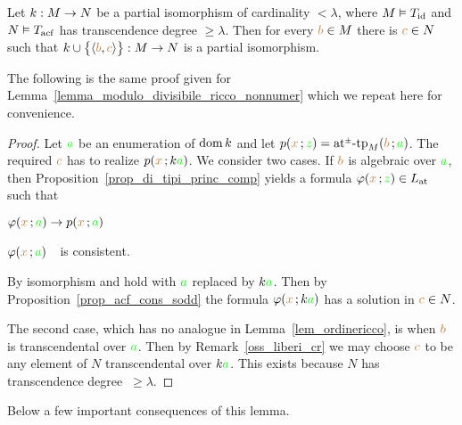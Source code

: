 \begin{lemma}\label{lem_acf_ricco_nonnumer}
Let $k:M\imp N$ be a partial isomorphism of cardinality $<\lambda$, where $M\models T_{\rm id}$ and $N\models T_{\rm acf}$ has transcendence degree $\ge\lambda$.
%
Then for every ${\mr b}\in M$ there is ${\mr c}\in N$ such that $k\cup\big\{\<{\mr b},{\mr c}\>\big\}:M\imp N$ is a partial isomorphism.
\end{lemma}

The following is the same proof given for Lemma~\ref{lemma_modulo_divisibile_ricco_nonnumer} which we repeat here for convenience.

\vspace*{-\parskip}
\begin{proof}
Let ${\gr a}$ be an enumeration of $\dom k$ and let $p({\mr x}\,;{\gr z})=\atpmtp_M({\mr b}\,;{\gr a})$.
%
The required ${\mr c}$ has to realize $p({\mr x}\,;k{\gr a})$.
%
We consider two cases.
%
If ${\mr b}$ is algebraic over ${\gr a}$, then Proposition~\ref{prop_di_tipi_princ_comp} yields a formula $\phi({\mr x}\,;{\gr z})\in L_{\rm at}$ such that 

\noindent{}\hspace{5ex} $\phi({\mr x}\,;{\gr a})\imp p({\mr x}\,;{\gr a})$

\noindent{}\hspace{5ex} $\phi({\mr x}\,;{\gr a})$\ \ is consistent.

By isomorphism  and  hold with ${\gr a}$ replaced by $k{\gr a}$.
%
Then by Proposition~\ref{prop_acf_cons_sodd} the formula $\phi({\mr x}\,;k{\gr a})$ has a solution in ${\mr c}\in N$.

The second case, which has no analogue in Lemma~\ref{lem_ordinericco}, is when ${\mr b}$ is transcendental over ${\gr a}$.
%
Then by  Remark~\ref{oss_liberi_cr} we may choose ${\mr c}$ to be any element of $N$ transcendental over $k{\gr a}$.
%
This exists because $N$ has transcendence degree $\ \ge\lambda$.
\end{proof}

Below a few important consequences of this lemma.

